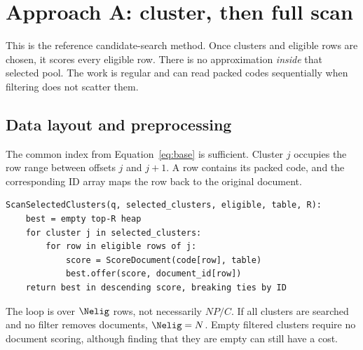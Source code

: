 \section{Approach A: cluster, then full scan}
\label{sec:scan}
This is the reference candidate-search method. Once clusters and eligible rows are chosen,
it scores every eligible row. There is no approximation \emph{inside} that selected pool.
The work is regular and can read packed codes sequentially when filtering does not scatter them.


\subsection{Data layout and preprocessing}
The common index from Equation~\eqref{eq:base} is sufficient. Cluster $j$ occupies the row
range between offsets $j$ and $j+1$. A row contains its packed code, and the corresponding ID
array maps the row back to the original document.

\par\noindent\begin{minipage}{\linewidth}
\begin{lstlisting}[caption={Candidate search for Approach A.}]
ScanSelectedClusters(q, selected_clusters, eligible, table, R):
    best = empty top-R heap
    for cluster j in selected_clusters:
        for row in eligible rows of j:
            score = ScoreDocument(code[row], table)
            best.offer(score, document_id[row])
    return best in descending score, breaking ties by ID
\end{lstlisting}
\end{minipage}\par

The loop is over $\Nelig$ rows, not necessarily $NP/C$. If all clusters are searched and no
filter removes documents, $\Nelig=N$. Empty filtered clusters require no document scoring,
although finding that they are empty can still have a cost.

